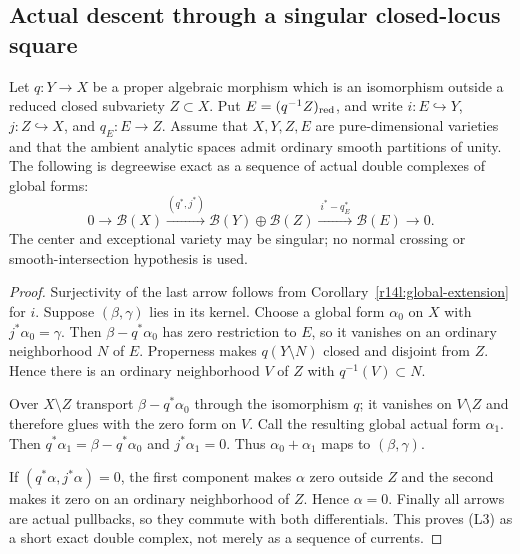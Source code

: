 \subsection{Actual descent through a singular closed-locus square}

\begin{theorem}
\label{r14l:modification-square}
Let $q:Y\to X$ be a proper algebraic morphism which is an
isomorphism outside a reduced closed subvariety $Z\subset X$.
Put $E=(q^{-1}Z)_{\rm red}$, and write $i:E\hookrightarrow Y$,
$j:Z\hookrightarrow X$, and $q_E:E\to Z$. Assume that
$X,Y,Z,E$ are pure-dimensional varieties and that the ambient
analytic spaces admit ordinary smooth partitions of unity.
The following is degreewise exact as a sequence of actual
double complexes of global forms:
\[
0\longrightarrow\mathcal B(X)
 \xrightarrow{(q^*,j^*)}\mathcal B(Y)\oplus\mathcal B(Z)
 \xrightarrow{\ i^*-q_E^*\ }\mathcal B(E)
 \longrightarrow0.
\tag{L3}\label{r14l:modification-sequence}
\]
The center and exceptional variety may be singular; no normal
crossing or smooth-intersection hypothesis is used.
\end{theorem}

\begin{proof}
Surjectivity of the last arrow follows from
Corollary~\ref{r14l:global-extension} for $i$.
Suppose $(\beta,\gamma)$ lies in its kernel.
Choose a global form $\alpha_0$ on $X$ with
$j^*\alpha_0=\gamma$. Then
$\beta-q^*\alpha_0$ has zero restriction to $E$, so it
vanishes on an ordinary neighborhood $N$ of $E$.
Properness makes $q(Y\setminus N)$ closed and disjoint from
$Z$. Hence there is an ordinary neighborhood $V$ of $Z$ with
$q^{-1}(V)\subset N$.

Over $X\setminus Z$ transport $\beta-q^*\alpha_0$ through
the isomorphism $q$; it vanishes on $V\setminus Z$ and
therefore glues with the zero form on $V$. Call the resulting
global actual form $\alpha_1$. Then
$q^*\alpha_1=\beta-q^*\alpha_0$ and $j^*\alpha_1=0$.
Thus $\alpha_0+\alpha_1$ maps to $(\beta,\gamma)$.

If $(q^*\alpha,j^*\alpha)=0$, the first component makes
$\alpha$ zero outside $Z$ and the second makes it zero on an
ordinary neighborhood of $Z$. Hence $\alpha=0$.
Finally all arrows are actual pullbacks, so they commute with
both differentials. This proves (L3) as a short exact double
complex, not merely as a sequence of currents.
\end{proof}

